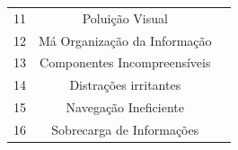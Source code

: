 \begin{table}[]
\begin{tabular}{|l|c|l|l|l|l|l|}
		\multicolumn{1}{|c|}{11} & \multicolumn{5}{c|}{Poluição Visual}                                                         & \multirow{6}{*}{}               \\ \cline{1-6}
		\multicolumn{1}{|c|}{12} & \multicolumn{5}{c|}{Má Organização da Informação}                                            &                                 \\ \cline{1-6}
		\multicolumn{1}{|c|}{13} & \multicolumn{5}{c|}{Componentes Incompreensíveis}                                            &                                 \\ \cline{1-6}
		\multicolumn{1}{|c|}{14} & \multicolumn{5}{c|}{Distrações irritantes}                                                   &                                 \\ \cline{1-6}
		\multicolumn{1}{|c|}{15} & \multicolumn{5}{c|}{Navegação Ineficiente}                                                   &                                 \\ \cline{1-6}
		\multicolumn{1}{|c|}{16} & \multicolumn{5}{c|}{Sobrecarga de Informações}                                               &                                 \\ \hline
	\end{tabular}
\end{table}
